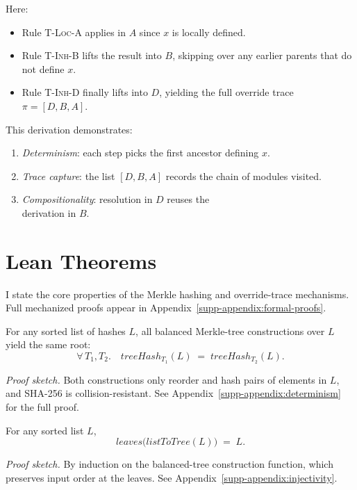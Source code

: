 \documentclass[sigplan,screen]{acmart}
\begin{document}
Here:
\begin{itemize}
	\item Rule \textsc{T-Loc-A} applies in $A$ since $x$ is locally defined.
	\item Rule \textsc{T-Inh-B} lifts the result into $B$, skipping over any earlier parents that do not define $x$.
	\item Rule \textsc{T-Inh-D} finally lifts into $D$, yielding the full override trace $\pi = [D,B,A]$.
\end{itemize}

This derivation demonstrates:
\begin{enumerate}
	\item \emph{Determinism}: each step picks the first ancestor defining $x$.
	\item \emph{Trace capture}: the list $[D,B,A]$ records the chain of modules visited.
	\item \emph{Compositionality}: resolution in $D$ reuses the \\derivation in $B$.
\end{enumerate}

\section{Lean Theorems}
\label{sec:lean-theorems}

I state the core properties of the Merkle hashing and override-trace mechanisms.  Full mechanized proofs appear in Appendix~\ref{supp-appendix:formal-proofs}.

\begin{theorem}
\label{thm:treeHash_deterministic}
For any sorted list of hashes \(L\), all balanced Merkle-tree constructions over \(L\) yield the same root:
\[
	\forall\,T_1, T_2.\quad
		\mathit{treeHash}_{T_1}(L) \;=\; \mathit{treeHash}_{T_2}(L).
\]
\end{theorem}
\noindent\emph{Proof sketch.}  Both constructions only reorder and hash pairs of elements in \(L\), and SHA-256 is collision-resistant.  See Appendix~\ref{supp-appendix:determinism} for the full proof.

\begin{lemma}
\label{lem:listToTree_correctness}
For any sorted list \(L\),
\[
	\mathit{leaves}\bigl(\mathit{listToTree}(L)\bigr) \;=\; L.
\]
\end{lemma}
\noindent\emph{Proof sketch.}  By induction on the balanced-tree construction function, which preserves input order at the leaves.  See Appendix~\ref{supp-appendix:injectivity}.
\end{document}
